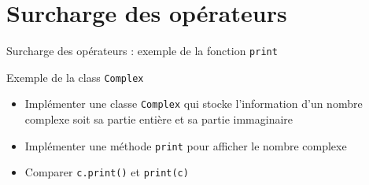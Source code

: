 \documentclass[10pt]{beamer}
\begin{document}










\section{Surcharge des opérateurs}

\begin{frame}[fragile]{Surcharge des opérateurs : exemple de la fonction \texttt{print}}

  \begin{block}{Exemple de la class \texttt{Complex}}
    \medskip
    \begin{itemize}
      \item Implémenter une classe \texttt{Complex} qui stocke l'information d'un nombre complexe soit sa partie entière et sa partie immaginaire
      \item Implémenter une méthode \texttt{print} pour afficher le nombre complexe
      \item Comparer \texttt{c.print()} et \texttt{print(c)}
    \end{itemize}
  \end{block}
\end{frame}
\end{document}
